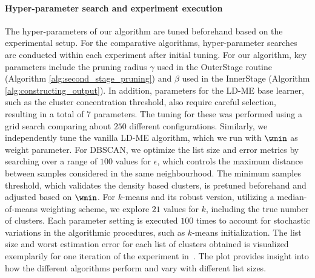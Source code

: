 \paragraph{Hyper-parameter search and experiment execution}
The hyper-parameters of our algorithm are tuned beforehand based on the experimental setup. For the comparative algorithms, hyper-parameter searches are conducted within each experiment after initial tuning. For our algorithm, key parameters include the pruning radius \(\gamma\) used in the OuterStage routine (Algorithm \ref{alg:second_stage_pruning}) and \(\beta\) used in the InnerStage (Algorithm \ref{alg:constructing_output}). In addition, parameters for the LD-ME base learner, such as the cluster concentration threshold, also require careful selection, resulting in a total of 7 parameters. The tuning for these was performed using a grid search comparing about \(250\) different configurations. Similarly, we independently tune the vanilla LD-ME algorithm, which we run with \(\wmin\) as weight parameter. For DBSCAN, we optimize the list size and error metrics by searching over a range of \(100\) values for \(\epsilon\), which controls the maximum distance between samples considered in the same neighbourhood. The minimum samples threshold, which validates the density based clusters, is pretuned beforehand and adjusted based on \(\wmin\). For \(k\)-means and its robust version, utilizing a median-of-means weighting scheme, we explore \(21\) values for \(k\), including the true number of clusters. 
Each parameter setting is executed \(100\) times to account for stochastic variations in the algorithmic procedures, such as \(k\)-means initialization. The list size and worst estimation error for each list of clusters obtained is visualized exemplarily for one iteration of the experiment in~. The plot provides insight into how the different algorithms perform and vary with different list sizes.

